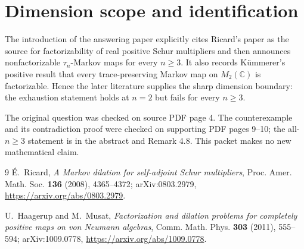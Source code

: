 \documentclass[11pt]{article}
\begin{document}
\section*{Dimension scope and identification}

The introduction of the answering paper explicitly cites Ricard's paper as
the source for factorizability of real positive Schur multipliers and then
announces nonfactorizable $\tau_n$-Markov maps for every $n\ge3$.  It also
records K\"ummerer's positive result that every trace-preserving Markov map
on $M_2(\mathbb C)$ is factorizable.  Hence the later literature supplies the
sharp dimension boundary: the exhaustion statement holds at $n=2$ but
fails for every $n\ge3$.

The original question was checked on source PDF page 4.  The counterexample
and its contradiction proof were checked on supporting PDF pages 9--10; the
all-$n\ge3$ statement is in the abstract and Remark 4.8.  This packet makes
no new mathematical claim.

\begin{thebibliography}{9}
É.~Ricard,
\emph{A Markov dilation for self-adjoint Schur multipliers},
Proc. Amer. Math. Soc. \textbf{136} (2008), 4365--4372;
arXiv:0803.2979,
\url{https://arxiv.org/abs/0803.2979}.

U.~Haagerup and M.~Musat,
\emph{Factorization and dilation problems for completely positive maps on
von Neumann algebras},
Comm. Math. Phys. \textbf{303} (2011), 555--594;
arXiv:1009.0778,
\url{https://arxiv.org/abs/1009.0778}.
\end{thebibliography}
\end{document}
